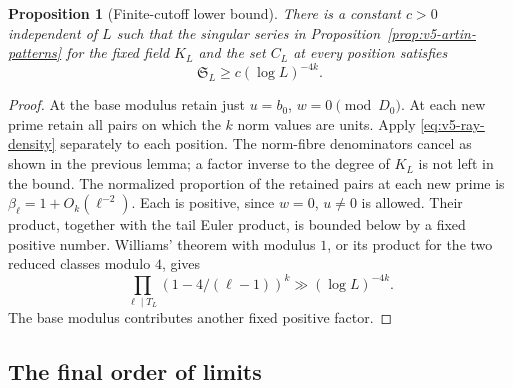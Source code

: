 \documentclass[11pt]{article}
\newtheorem{proposition}[theorem]{Proposition}
\theoremstyle{definition}
\theoremstyle{remark}
\begin{document}
\begin{proposition}[Finite-cutoff lower bound]\label{prop:v5-cutoff-lower}
There is a constant $c>0$ independent of $L$ such that the singular series
in Proposition~\ref{prop:v5-artin-patterns} for the fixed field $K_L$ and
the set $C_L$ at every position satisfies
\[
 \mathfrak S_L\geq c(\log L)^{-4k}.
\]
\end{proposition}
\begin{proof}
At the base modulus retain just $u=b_0$, $w=0\pmod{D_0}$.
At each new prime retain all pairs on which the $k$ norm values are units.
Apply \eqref{eq:v5-ray-density} separately to each position.
The norm-fibre denominators cancel as shown in the previous lemma; a
factor inverse to the degree of $K_L$ is not left in the bound.
The normalized proportion of the retained pairs at each new prime is
$\beta_\ell=1+O_k(\ell^{-2})$. Each is positive, since $w=0$, $u\ne0$
is allowed. Their product, together with the tail Euler product, is
bounded below by a fixed positive number. Williams' theorem with modulus
$1$, or its product for the two reduced classes modulo $4$, gives
\[
 \prod_{\ell\mid T_L}(1-4/(\ell-1))^k
       \gg(\log L)^{-4k}.
\]
The base modulus contributes another fixed positive factor.
\end{proof}

\subsection{The final order of limits}\label{subsec:v5-diagonal}
\end{document}
